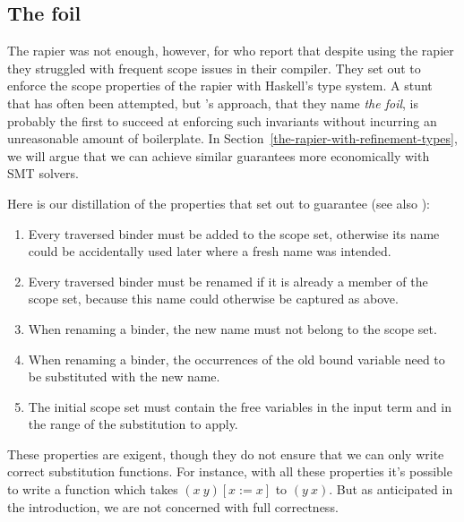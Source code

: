 \documentclass[sigconf]{acmart}
\begin{document}
\subsection{The foil}
\label{the-rapier-with-stronger-types}

The rapier was not enough, however, for \citet{maclaurin23} who report that
despite using the rapier they struggled with frequent scope issues in their
compiler. They set out to enforce the scope properties of the rapier with
Haskell's type system. A stunt that has often been attempted, but
\citeauthor{maclaurin23}'s approach, that they name \emph{the foil}, is probably the
first to succeed at enforcing such invariants without incurring an unreasonable
amount of boilerplate.
In Section~\ref{the-rapier-with-refinement-types}, we will argue that we can
achieve similar guarantees more economically with SMT solvers.

Here is our distillation of the properties that \citeauthor{maclaurin23} set
out to guarantee (see also \cite[Section~4]{maclaurin23}):
\begin{enumerate}
\item Every traversed binder must be added to the scope set, otherwise its name
      could be accidentally used later where a fresh name was intended.
\item \label{req:always-rename} Every traversed binder must be renamed if it is already a member of the
      scope set, because this name could otherwise be captured as above.
\item When renaming a binder, the new name must not belong to the scope set.
\item When renaming a binder, the occurrences of the old bound variable need
      to be substituted with the new name.
\item The initial scope set must contain the free variables in the input term
      and in the range of the substitution to apply.
\end{enumerate}

These properties are exigent, though they do not ensure that we can only write correct
substitution functions. For instance, with all these properties it's possible
to write a function which takes $(x\ y)[x:=x]$ to $(y\ x)$.
But as anticipated in the
introduction, we are not concerned with full correctness.
\end{document}
